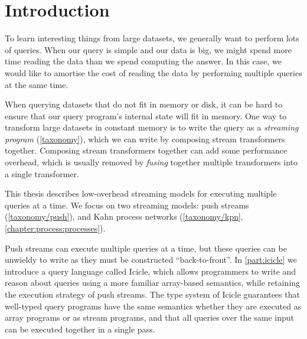 \chapter{Introduction}
\label{introduction}
To learn interesting things from large datasets, we generally want to perform lots of queries.
When our query is simple and our data is big, we might spend more time reading the data than we spend computing the answer.
In this case, we would like to amortise the cost of reading the data by performing multiple queries at the same time.

When querying datasets that do not fit in memory or disk, it can be hard to ensure that our query program's internal state will fit in memory.
One way to transform large datasets in constant memory is to write the query as a \emph{streaming program} (\cref{taxonomy}), which we can write by composing stream transformers together.
Composing stream transformers together can add some performance overhead, which is usually removed by \emph{fusing} together multiple transformers into a single transformer.

This thesis describes low-overhead streaming models for executing multiple queries at a time.
We focus on two streaming models: push streams (\cref{taxonomy/push}), and Kahn process networks (\cref{taxonomy/kpn}, \cref{chapter:process:processes}).

Push streams can execute multiple queries at a time, but these queries can be unwieldy to write as they must be constructed ``back-to-front''.
In \cref{part:icicle} we introduce a query language called Icicle, which allows programmers to write and reason about queries using a more familiar array-based semantics, while retaining the execution strategy of push streams.
The type system of Icicle guarantees that well-typed query programs have the same semantics whether they are executed as array programs or as stream programs, and that all queries over the same input can be executed together in a single pass.

